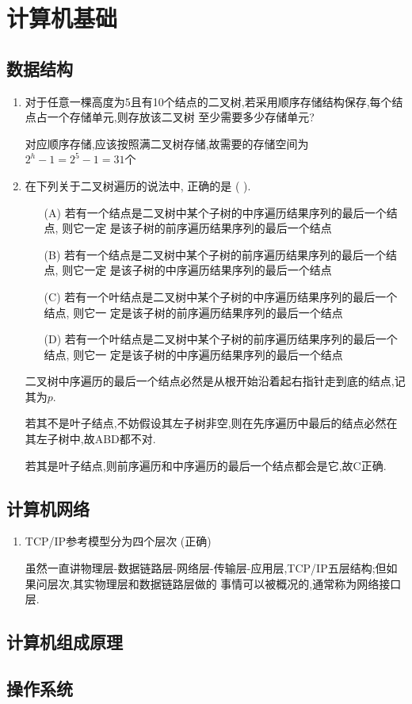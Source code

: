 \documentclass[12pt, a4paper, oneside, UTF8]{ctexbook}
\begin{document}
% 
\else
\fi
\chapter{计算机基础}
\section{数据结构}
\begin{enumerate}
    \item 对于任意一棵高度为5且有10个结点的二叉树,若采用顺序存储结构保存,每个结点占一个存储单元,则存放该二叉树
    至少需要多少存储单元? 
    \begin{solution}
    对应顺序存储,应该按照满二叉树存储,故需要的存储空间为$2^h-1=2^5-1=31$个
    \end{solution}
    \item 在下列关于二叉树遍历的说法中, 正确的是 (   ).
    \begin{enumerate}
        \item[(A)]若有一个结点是二叉树中某个子树的中序遍历结果序列的最后一个结点, 则它一定
        是该子树的前序遍历结果序列的最后一个结点
        \item[(B)] 若有一个结点是二叉树中某个子树的前序遍历结果序列的最后一个结点, 则它一定
        是该子树的中序遍历结果序列的最后一个结点
        \item[(C)]若有一个叶结点是二叉树中某个子树的中序遍历结果序列的最后一个结点, 则它一
        定是该子树的前序遍历结果序列的最后一个结点
        \item[(D)] 若有一个叶结点是二叉树中某个子树的前序遍历结果序列的最后一个结点, 则它一
        定是该子树的中序遍历结果序列的最后一个结点
    \end{enumerate}
    \begin{solution}
        二叉树中序遍历的最后一个结点必然是从根开始沿着起右指针走到底的结点,记其为$p$. 
        
        若其不是叶子结点,不妨假设其左子树非空,则在先序遍历中最后的结点必然在其左子树中,故ABD都不对.  

        若其是叶子结点,则前序遍历和中序遍历的最后一个结点都会是它,故C正确.
    \end{solution}
\end{enumerate}
\section{计算机网络}
\begin{enumerate}
    \item TCP/IP参考模型分为四个层次 (正确) 
    \begin{solution}
        虽然一直讲物理层-数据链路层-网络层-传输层-应用层,TCP/IP五层结构;但如果问层次,其实物理层和数据链路层做的
        事情可以被概况的,通常称为网络接口层.
    \end{solution}
\end{enumerate}

\section{计算机组成原理}

\section{操作系统}
\ifx\allfiles\undefined
\end{document}
